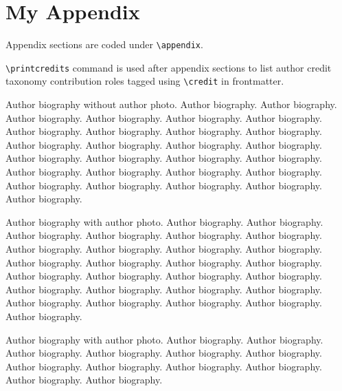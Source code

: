 \documentclass[a4paper,fleqn]{cas-dc}
\begin{document}
\appendix
\section{My Appendix}
Appendix sections are coded under \verb+\appendix+.

\verb+\printcredits+ command is used after appendix sections to list 
author credit taxonomy contribution roles tagged using \verb+\credit+ 
in frontmatter.

\printcredits

%






\bio{}
Author biography without author photo.
Author biography. Author biography. Author biography.
Author biography. Author biography. Author biography.
Author biography. Author biography. Author biography.
Author biography. Author biography. Author biography.
Author biography. Author biography. Author biography.
Author biography. Author biography. Author biography.
Author biography. Author biography. Author biography.
Author biography. Author biography. Author biography.
Author biography. Author biography. Author biography.
\endbio

Author biography with author photo.
Author biography. Author biography. Author biography.
Author biography. Author biography. Author biography.
Author biography. Author biography. Author biography.
Author biography. Author biography. Author biography.
Author biography. Author biography. Author biography.
Author biography. Author biography. Author biography.
Author biography. Author biography. Author biography.
Author biography. Author biography. Author biography.
Author biography. Author biography. Author biography.
\endbio

Author biography with author photo.
Author biography. Author biography. Author biography.
Author biography. Author biography. Author biography.
Author biography. Author biography. Author biography.
Author biography. Author biography. Author biography.
\endbio
\end{document}
